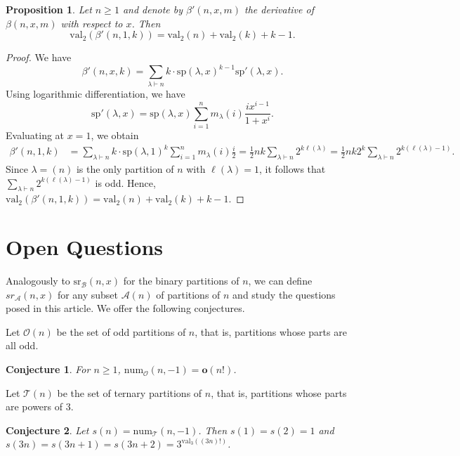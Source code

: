 \documentclass[reqno]{amsart}
\def\sp{\mathrm{sp}}
\def\sr{\mathrm{sr}}
\def\num{\mathrm{num}}
\def\val{\mathrm{val}}
\def\o{\mathbf o}
\newtheorem{proposition}[theorem]{Proposition}
\newtheorem{conjecture}{Conjecture}
\theoremstyle{definition}
\begin{document}
\begin{proposition}
    Let $n \geq 1$ and denote by $\beta'(n,x,m)$ the derivative of $\beta(n,x,m)$ with respect to $x$. Then 
$$\val_2(\beta'(n,1,k)) = \val_2(n)+\val_2(k)+k-1.$$
\end{proposition}
\begin{proof} 
We have $$\beta'(n,x,k)=\sum_{\lambda\vdash n} k\cdot \sp(\lambda, x)^{k-1}\sp'(\lambda, x).$$ Using logarithmic differentiation, we have $$\sp'(\lambda, x)=\sp(\lambda, x)\sum_{i=1}^nm_\lambda(i)\frac{ix^{i-1}}{1+x^i}.$$ Evaluating at $x=1$, we obtain
\begin{align*}\beta'(n,1,k)& =\sum_{\lambda\vdash n} k\cdot \sp(\lambda, 1)^{k}\sum_{i=1}^nm_\lambda(i)\frac{i}{2}= \frac{1}{2}nk \sum_{\lambda\vdash n}2^{k\ell(\lambda)}= \frac{1}{2}nk 2^k \sum_{\lambda\vdash n}2^{k(\ell(\lambda)-1)}.\end{align*} Since $\lambda=(n)$ is the only partition of $n$ with $\ell(\lambda)=1$, it follows that $\sum_{\lambda\vdash n}2^{k(\ell(\lambda)-1)}$ is odd. Hence, $\val_2(\beta'(n,1,k)) = \val_2(n)+\val_2(k)+k-1.$
\end{proof}








\section{Open Questions}\label{sec:conclud}

Analogously to $\sr_\mathcal{B}(n,x)$ for the binary partitions of $n$, we can define $sr_{\mathcal A}(n,x)$ for any subset $\mathcal A(n)$ of partitions of $n$ and study the questions posed in this article. We offer the following conjectures. 



Let $\mathcal{O}(n)$ be the set of odd partitions of $n$, that is, partitions whose parts are all odd. 
\begin{conjecture}\label{conj:odd}
For $n\ge1$, $\num_\mathcal{O}(n,-1)=\o(n!)$.
\end{conjecture}



Let $\mathcal{T}(n)$ be the set of ternary partitions of $n$, that is, partitions whose parts are powers of $3$. 

\begin{conjecture}\label{conj:s}
Let $s(n) = \num_\mathcal{T}(n,-1)$. Then $s(1)=s(2)=1$ and $s(3n)=s(3n+1)=s(3n+2) = 3^{\val_3((3n)!)}$.
\end{conjecture}
\end{document}
